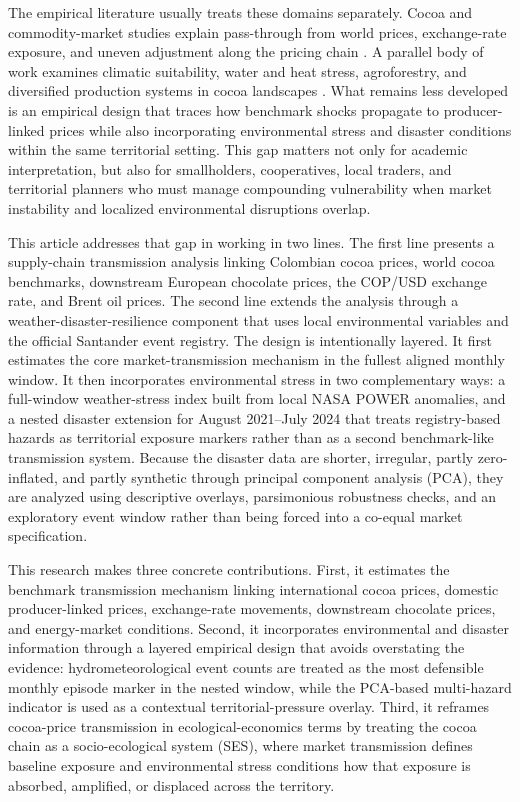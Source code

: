 \documentclass[11pt]{article}
\begin{document}
The empirical literature usually treats these domains separately. Cocoa and commodity-market studies explain pass-through from world prices, exchange-rate exposure, and uneven adjustment along the pricing chain \citep{TsowouGayi2019,Jumah2001,MeyerCramon2004,JimenezRodriguez2022}. A parallel body of work examines climatic suitability, water and heat stress, agroforestry, and diversified production systems in cocoa landscapes \citep{Schroth2016,Lahive2019,Niether2020}. What remains less developed is an empirical design that traces how benchmark shocks propagate to producer-linked prices while also incorporating environmental stress and disaster conditions within the same territorial setting. This gap matters not only for academic interpretation, but also for smallholders, cooperatives, local traders, and territorial planners who must manage compounding vulnerability when market instability and localized environmental disruptions overlap.

This article addresses that gap in working in two lines. The first line presents a supply-chain transmission analysis linking Colombian cocoa prices, world cocoa benchmarks, downstream European chocolate prices, the COP/USD exchange rate, and Brent oil prices. The second line extends the analysis through a weather-disaster-resilience component that uses local environmental variables and the official Santander event registry. The design is intentionally layered. It first estimates the core market-transmission mechanism in the fullest aligned monthly window. It then incorporates environmental stress in two complementary ways: a full-window weather-stress index built from local NASA POWER anomalies, and a nested disaster extension for August 2021--July 2024 that treats registry-based hazards as territorial exposure markers rather than as a second benchmark-like transmission system. Because the disaster data are shorter, irregular, partly zero-inflated, and partly synthetic through principal component analysis (PCA), they are analyzed using descriptive overlays, parsimonious robustness checks, and an exploratory event window rather than being forced into a co-equal market specification.

This research makes three concrete contributions. First, it estimates the benchmark transmission mechanism linking international cocoa prices, domestic producer-linked prices, exchange-rate movements, downstream chocolate prices, and energy-market conditions. Second, it incorporates environmental and disaster information through a layered empirical design that avoids overstating the evidence: hydrometeorological event counts are treated as the most defensible monthly episode marker in the nested window, while the PCA-based multi-hazard indicator is used as a contextual territorial-pressure overlay. Third, it reframes cocoa-price transmission in ecological-economics terms by treating the cocoa chain as a socio-ecological system (SES), where market transmission defines baseline exposure and environmental stress conditions how that exposure is absorbed, amplified, or displaced across the territory.
\end{document}
